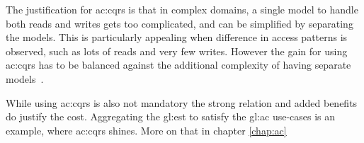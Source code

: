 The justification for \gls{ac:cqrs} is that in complex domains, a single model to handle both reads and writes gets too complicated, and can be simplified by separating the models. This is particularly appealing when difference in access patterns is observed, such as lots of reads and very few writes. However the gain for using \gls{ac:cqrs} has to be balanced against the additional complexity of having separate models~\citep{esvsed}.

While using \gls{ac:cqrs} is also not mandatory the strong relation and added benefits do justify the cost. Aggregating the \gls{gl:est} to satisfy the \gls{gl:ac} use-cases is an example, where \gls{ac:cqrs} shines. More on that in chapter \ref{chap:ac}







